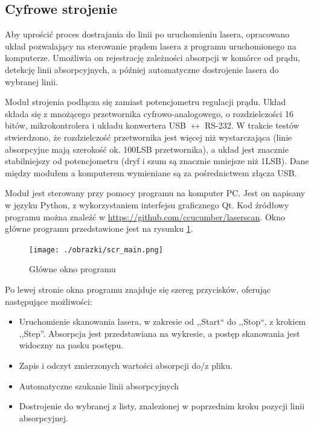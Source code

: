 \documentclass[a4paper,10pt,twoside]{article}
\begin{document}
\subsection{Cyfrowe strojenie}

Aby uprościć proces dostrajania do linii po uruchomieniu lasera, opracowano układ pozwalający na sterowanie prądem lasera z programu uruchomionego na komputerze.
Umożliwia on rejestrację zależności absorpcji w komórce od prądu, detekcję linii absorpcyjnych, a później automatyczne dostrojenie lasera do wybranej linii.

Moduł strojenia podłącza się zamiast potencjometru regulacji prądu. Układ składa się z mnożącego przetwornika cyfrowo-analogowego, o rozdzielczości 16 bitów, mikrokontrolera i układu konwertera USB $\leftrightarrow$ RS-232. W trakcie testów stwierdzono, że rozdzielczość przetwornika jest więcej niż wystarczająca (linie absorpcyjne mają szerokość ok. 100LSB przetwornika), a układ jest znacznie stabilniejszy od potencjometru (dryf i szum są znacznie mniejsze niż 1LSB). Dane między modułem a komputerem wymieniane są za pośrednictwem złącza USB.

Moduł jest sterowany przy pomocy programu na komputer PC. Jest on napisany w języku Python, z wykorzystaniem interfejsu graficznego Qt. Kod źródłowy programu można znaleźć w \url{https://github.com/ccucumber/laserscan}. Okno główne programu przedstawione jest na rysunku \ref{scr-main}.

\begin{figure}
\begin{center}
 \texttt{[image: ./obrazki/scr\_main.png]}
\end{center}
\caption{Główne okno programu}
\label{scr-main}
\end{figure}


Po lewej stronie okna programu znajduje się szereg przycisków, oferując następujące możliwości:

\begin{itemize}
 \item Uruchomienie skanowania lasera, w zakresie od ,,Start`` do ,,Stop``, z krokiem ,,Step''. Absorpcja jest przedstawiana na wykresie, a postęp skanowania jest widoczny na pasku postępu.
 \item Zapis i odczyt zmierzonych wartości absorpcji do/z pliku.
 \item Automatyczne szukanie linii absorpcyjnych
 \item Dostrojenie do wybranej z listy, znalezionej w poprzednim kroku pozycji linii absorpcyjnej.
\end{itemize}
\end{document}
